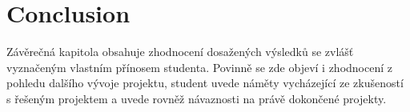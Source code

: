 





\chapter{Conclusion}
Závěrečná kapitola obsahuje zhodnocení dosažených výsledků se zvlášť vyznačeným vlastním přínosem studenta. Povinně se zde objeví i zhodnocení z pohledu dalšího vývoje projektu, student uvede náměty vycházející ze zkušeností s řešeným projektem a uvede rovněž návaznosti na právě dokončené projekty.

